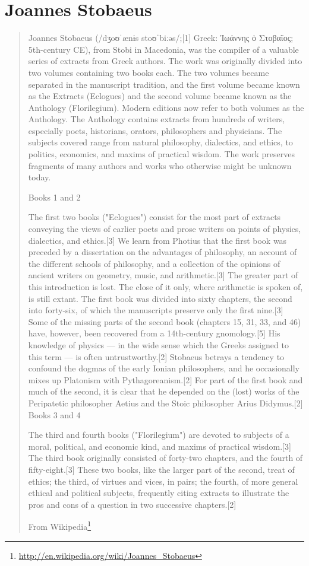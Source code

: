 \documentclass[12pt,letterpaper,twoside,final]{memoir}
\begin{document}
\section{Joannes Stobaeus}
\blockquote[From Wikipedia\footnote{\url{http://en.wikipedia.org/wiki/Joannes_Stobaeus}}]{Joannes Stobaeus (/dʒoʊˈænɨs stoʊˈbiːəs/;[1] Greek: Ἰωάννης ὁ Στοβαῖος; 5th-century CE), from Stobi in Macedonia, was the compiler of a valuable series of extracts from Greek authors. The work was originally divided into two volumes containing two books each. The two volumes became separated in the manuscript tradition, and the first volume became known as the Extracts (Eclogues) and the second volume became known as the Anthology (Florilegium). Modern editions now refer to both volumes as the Anthology. The Anthology contains extracts from hundreds of writers, especially poets, historians, orators, philosophers and physicians. The subjects covered range from natural philosophy, dialectics, and ethics, to politics, economics, and maxims of practical wisdom. The work preserves fragments of many authors and works who otherwise might be unknown today.


Books 1 and 2

The first two books ("Eclogues") consist for the most part of extracts conveying the views of earlier poets and prose writers on points of physics, dialectics, and ethics.[3] We learn from Photius that the first book was preceded by a dissertation on the advantages of philosophy, an account of the different schools of philosophy, and a collection of the opinions of ancient writers on geometry, music, and arithmetic.[3] The greater part of this introduction is lost. The close of it only, where arithmetic is spoken of, is still extant. The first book was divided into sixty chapters, the second into forty-six, of which the manuscripts preserve only the first nine.[3] Some of the missing parts of the second book (chapters 15, 31, 33, and 46) have, however, been recovered from a 14th-century gnomology.[5] His knowledge of physics — in the wide sense which the Greeks assigned to this term — is often untrustworthy.[2] Stobaeus betrays a tendency to confound the dogmas of the early Ionian philosophers, and he occasionally mixes up Platonism with Pythagoreanism.[2] For part of the first book and much of the second, it is clear that he depended on the (lost) works of the Peripatetic philosopher Aetius and the Stoic philosopher Arius Didymus.[2]
Books 3 and 4

The third and fourth books ("Florilegium") are devoted to subjects of a moral, political, and economic kind, and maxims of practical wisdom.[3] The third book originally consisted of forty-two chapters, and the fourth of fifty-eight.[3] These two books, like the larger part of the second, treat of ethics; the third, of virtues and vices, in pairs; the fourth, of more general ethical and political subjects, frequently citing extracts to illustrate the pros and cons of a question in two successive chapters.[2]}
\end{document}
